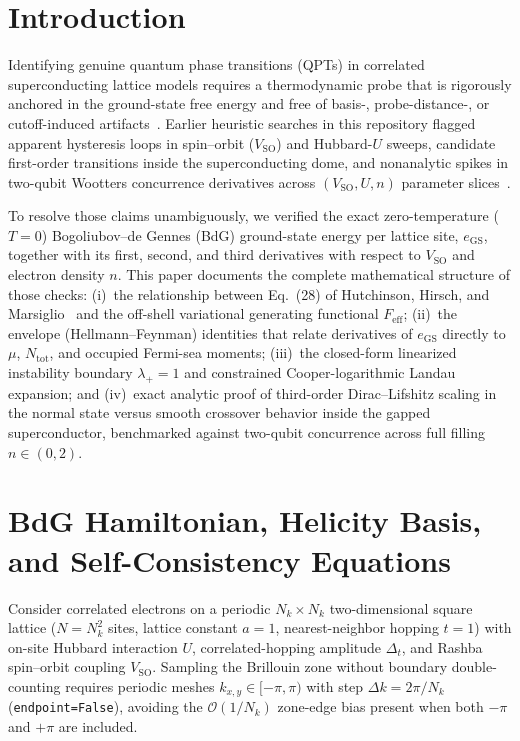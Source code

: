 \documentclass[aps,prb,twocolumn,superscriptaddress,longbibliography,floatfix]{revtex4-2}
\newcommand{\SO}{V_{\mathrm{SO}}}
\begin{document}
\maketitle

\section{Introduction}
\label{sec:intro}

Identifying genuine quantum phase transitions (QPTs) in correlated superconducting lattice models requires a thermodynamic probe that is rigorously anchored in the ground-state free energy and free of basis-, probe-distance-, or cutoff-induced artifacts~\cite{Sondhi1997,Hutchinson2018}. Earlier heuristic searches in this repository flagged apparent hysteresis loops in spin--orbit ($\SO$) and Hubbard-$U$ sweeps, candidate first-order transitions inside the superconducting dome, and nonanalytic spikes in two-qubit Wootters concurrence derivatives across $(\SO,U,n)$ parameter slices~\cite{Osterloh2002,Yang2005}.

To resolve those claims unambiguously, we verified the exact zero-temperature ($T=0$) Bogoliubov--de Gennes (BdG) ground-state energy per lattice site, $e_{\mathrm{GS}}$, together with its first, second, and third derivatives with respect to $\SO$ and electron density $n$. This paper documents the complete mathematical structure of those checks: (i)~the relationship between Eq.~(28) of Hutchinson, Hirsch, and Marsiglio~\cite{Hutchinson2018} and the off-shell variational generating functional $F_{\mathrm{eff}}$; (ii)~the envelope (Hellmann--Feynman) identities that relate derivatives of $e_{\mathrm{GS}}$ directly to $\mu$, $N_{\mathrm{tot}}$, and occupied Fermi-sea moments; (iii)~the closed-form linearized instability boundary $\lambda_+=1$ and constrained Cooper-logarithmic Landau expansion; and (iv)~exact analytic proof of third-order Dirac--Lifshitz scaling in the normal state versus smooth crossover behavior inside the gapped superconductor, benchmarked against two-qubit concurrence across full filling $n\in(0,2)$.

\section{BdG Hamiltonian, Helicity Basis, and Self-Consistency Equations}
\label{sec:model}

Consider correlated electrons on a periodic $N_k\times N_k$ two-dimensional square lattice ($N=N_k^2$ sites, lattice constant $a=1$, nearest-neighbor hopping $t=1$) with on-site Hubbard interaction $U$, correlated-hopping amplitude $\Delta_t$, and Rashba spin--orbit coupling $\SO$. Sampling the Brillouin zone without boundary double-counting requires periodic meshes $k_{x,y}\in[-\pi,\pi)$ with step $\Delta k = 2\pi/N_k$ (\texttt{endpoint=False}), avoiding the $\mathcal{O}(1/N_k)$ zone-edge bias present when both $-\pi$ and $+\pi$ are included.
\end{document}
